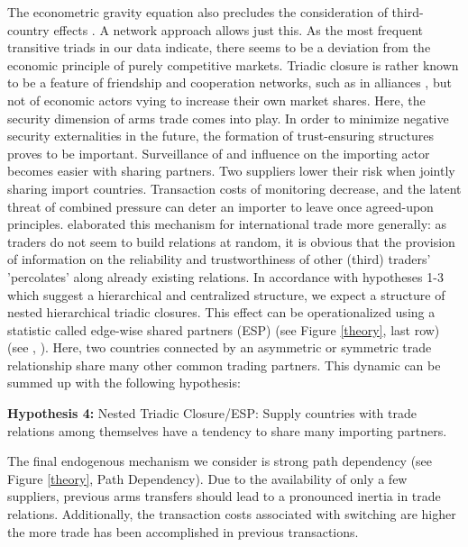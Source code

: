 \documentclass[12pt, letterpaper]{article}
\numberwithin{equation}{section}
\begin{document}
The econometric gravity equation also precludes the consideration of third-country effects \citep{WaAhAr:13}. A network approach allows just this. As the most frequent transitive triads in our data indicate, there seems to be a deviation from the economic principle of purely competitive markets. Triadic closure is rather known to be a feature of friendship and cooperation networks, such as in alliances \citep{Cran2012}, but not of economic actors vying to increase their own market shares. Here, the security dimension of arms trade comes into play. In order to minimize negative security externalities in the future, the formation of trust-ensuring structures proves to be important. Surveillance of and influence on the importing actor becomes easier with sharing partners. Two suppliers lower their risk when jointly sharing import countries. Transaction costs of monitoring decrease, and the latent threat of combined pressure can deter an importer to leave once agreed-upon principles. \cite{Chaney:2016} elaborated this mechanism for international trade more generally: as traders do not seem to build relations at random, it is obvious that the provision of information on the reliability and trustworthiness of other (third) traders’ 'percolates' along already existing relations.
In accordance with hypotheses 1-3 which suggest a hierarchical and centralized structure, we expect a structure of nested hierarchical triadic closures. This effect can be operationalized using a statistic called edge-wise shared partners (ESP) (see Figure \ref{theory}, last row) (see \cite{HunHan:06}, \cite{SnijPattRobHand:06}). Here, two countries connected by an asymmetric or symmetric trade relationship share many other common trading partners. This dynamic can be summed up with the following hypothesis:
\vspace{-0.5cm}	
\begin{itemize}
\begin{singlespace}
\item[] \textbf{Hypothesis 4:} Nested Triadic Closure/ESP: Supply countries with trade relations among themselves have a tendency to share many importing partners. 
\end{singlespace}
\end{itemize}
The final endogenous mechanism we consider is strong path dependency (see Figure \ref{theory}, Path Dependency). Due to the availability of only a few suppliers, previous arms transfers should lead to a pronounced inertia in trade relations. 
Additionally, the transaction costs associated with switching are higher the more trade has been accomplished in previous transactions. 
\end{document}
